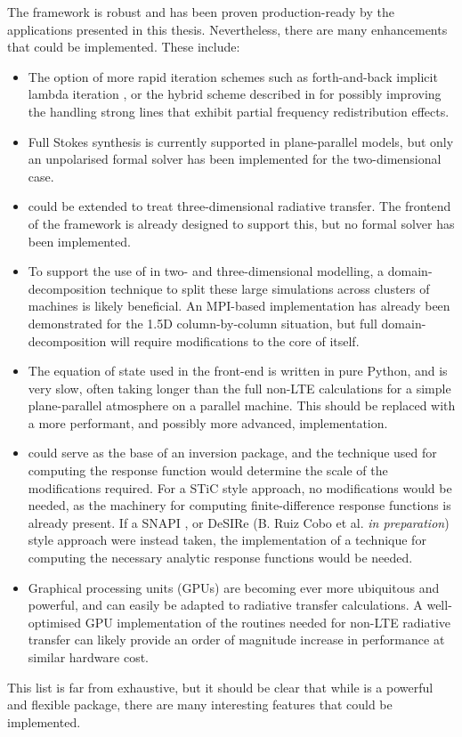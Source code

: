 The \Lw{} framework is robust and has been proven production-ready by the applications presented in this thesis.
Nevertheless, there are many enhancements that could be implemented.
These include:
\begin{itemize}
	\item The option of more rapid iteration schemes such as forth-and-back implicit lambda iteration \citep{AtanackovicVukmanovic1997,Kuzmanovska2017}, or the hybrid scheme described in \citet{Avrett2008} for possibly improving the handling strong lines that exhibit partial frequency redistribution effects.
	\item Full Stokes synthesis is currently supported in plane-parallel models, but only an unpolarised formal solver has been implemented for the two-dimensional case.
	\item \Lw{} could be extended to treat three-dimensional radiative transfer. The frontend of the framework is already designed to support this, but no formal solver has been implemented.
	\item To support the use of \Lw{} in two- and three-dimensional modelling, a domain-decomposition technique to split these large simulations across clusters of machines is likely beneficial. An MPI-based implementation has already been demonstrated for the 1.5D column-by-column situation, but full domain-decomposition will require modifications to the core of \Lw{} itself.
	\item The equation of state used in the front-end is written in pure Python, and is very slow, often taking longer than the full non-LTE calculations for a simple plane-parallel atmosphere on a parallel machine. This should be replaced with a more performant, and possibly more advanced, implementation.
	\item \Lw{} could serve as the base of an inversion package, and the technique used for computing the response function would determine the scale of the modifications required. For a STiC \citep{2019dlcr} style approach, no modifications would be needed, as the machinery for computing finite-difference response functions is already present. If a SNAPI \citep{Milic2018}, or DeSIRe (B. Ruiz Cobo et al. \emph{in preparation}) style approach were instead taken, the implementation of a technique for computing the necessary analytic response functions would be needed.
	\item Graphical processing units (GPUs) are becoming ever more ubiquitous and powerful, and can easily be adapted to radiative transfer calculations. A well-optimised GPU implementation of the routines needed for non-LTE radiative transfer can likely provide an order of magnitude increase in performance at similar hardware cost.
\end{itemize}
This list is far from exhaustive, but it should be clear that while \Lw{} is a powerful and flexible package, there are many interesting features that could be implemented.

